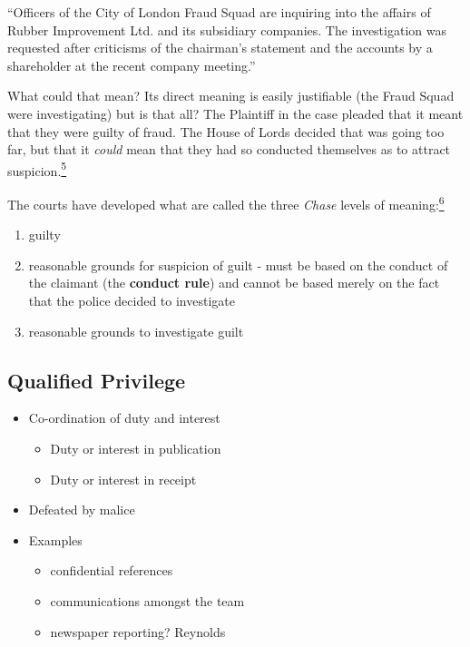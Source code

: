 \documentclass[]{article}
\begin{document}
``Officers of the City of London Fraud Squad are inquiring into the
affairs of Rubber Improvement Ltd. and its subsidiary companies. The
investigation was requested after criticisms of the chairman's statement
and the accounts by a shareholder at the recent company meeting.''

{{What could that mean? Its direct meaning is easily justifiable (the
Fraud Squad were investigating) but is that all? The Plaintiff in the
case pleaded that it meant that they were guilty of fraud. The House of
Lords decided that was going too far, but that it }}\emph{{could
}}{{mean that they had so conducted themselves as to attract
suspicion.\hyperref[sdfootnote5sym]{\textsuperscript{5}}}}

{{The courts have developed what are called the three }}\emph{{Chase}}{{
levels of meaning:\hyperref[sdfootnote6sym]{\textsuperscript{6}}}}

\begin{enumerate}
\item
  guilty
\item
  {{reasonable grounds for suspicion of guilt - must be based on the
  conduct of the claimant (the }}{\textbf{conduct rule}}{{) and cannot
  be based merely on the fact that the police decided to investigate}}
\item
  reasonable grounds to investigate guilt
\end{enumerate}

\subsection{Qualified Privilege}

\begin{itemize}
\item
  Co-ordination of duty and interest

  \begin{itemize}
  \item
    Duty or interest in publication
  \item
    Duty or interest in receipt
  \end{itemize}
\item
  Defeated by malice
\item
  Examples

  \begin{itemize}
  \item
    confidential references
  \item
    communications amongst the team
  \item
    newspaper reporting? Reynolds
  \end{itemize}
\end{itemize}
\end{document}
